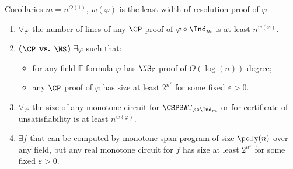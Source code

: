\newcommand{\ba}{{\color{blue} $\boldsymbol{\forall}$}}
\newcommand{\be}{{\color{blue} $\boldsymbol{\exists}$}}

\begin{frame}{Corollaries}
    $m = n^{O(1)}$, $w(\varphi)$ is the least width of resolution proof of $\varphi$

    \pause
    \begin{enumerate}
        \item \ba $\varphi$ the number of lines of any $\CP$ proof of $\varphi \circ \Ind_m$ is at least
            $n^{w(\varphi)}$.
        \pause
        \item \textbf{($\CP$ vs. $\NS$)} \be $\varphi$ such that:
            \begin{itemize}
                \item for any field $\mathbb{F}$ formula $\varphi$ has $\NS_{\mathbb{F}}$ proof of
                    $O(\log(n))$ degree;
                \item any $\CP$ proof of $\varphi$ has size at least $2^{n^{\varepsilon}}$ for some fixed
                    $\varepsilon > 0$.
            \end{itemize}
        \pause
        \vspace{0.4cm}    
        \item \ba $\varphi$ the size of any monotone circuit for $\CSPSAT_{\varphi \circ \Ind_m}$ or for
            certificate of unsatisfiability is at least $n^{w(\varphi)}$.
        \pause
        \item \be $f$ that can be computed by monotone span program of size $\poly(n)$ over any field,
            but any real monotone circuit for $f$ has size at least $2^{n^{\varepsilon}}$ for some fixed
            $\varepsilon > 0$.
    \end{enumerate}
\end{frame}
